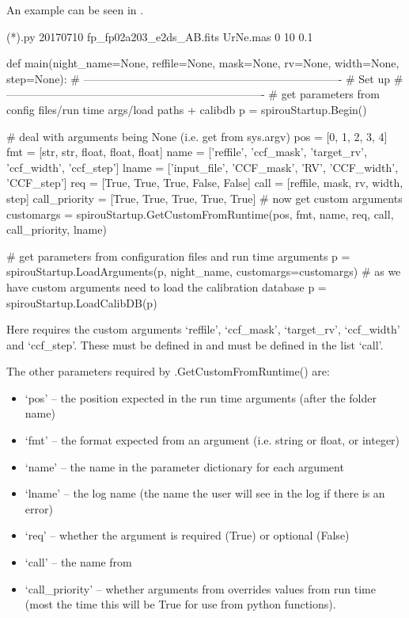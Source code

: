 \begin{minipage}{\textwidth}
An example can be seen in \calCCF.
\begin{cmdbox}
(*\calCCF*).py 20170710 fp_fp02a203_e2ds_AB.fits UrNe.mas 0 10 0.1
\end{cmdbox}
\begin{pythonbox}
def main(night_name=None, reffile=None, mask=None, rv=None, width=None,
         step=None):
    # ----------------------------------------------------------------------
    # Set up
    # ----------------------------------------------------------------------
    # get parameters from config files/run time args/load paths + calibdb
    p = spirouStartup.Begin()

    # deal with arguments being None (i.e. get from sys.argv)
    pos = [0, 1, 2, 3, 4]
    fmt = [str, str, float, float, float]
    name = ['reffile', 'ccf_mask', 'target_rv', 'ccf_width', 'ccf_step']
    lname = ['input_file', 'CCF_mask', 'RV', 'CCF_width', 'CCF_step']
    req = [True, True, True, False, False]
    call = [reffile, mask, rv, width, step]
    call_priority = [True, True, True, True, True]
    # now get custom arguments
    customargs = spirouStartup.GetCustomFromRuntime(pos, fmt, name, req, call,
                                                    call_priority, lname)
    
    # get parameters from configuration files and run time arguments
    p = spirouStartup.LoadArguments(p, night_name, customargs=customargs)
    # as we have custom arguments need to load the calibration database
    p = spirouStartup.LoadCalibDB(p)

\end{pythonbox}
\begin{note}
Here \calCCF requires the custom arguments `reffile', `ccf\_mask', `target\_rv', `ccf\_width' and `ccf\_step'. These must be defined in \progMAIN and must be defined in the list `call'. 

The other parameters required by \spirouStartup.GetCustomFromRuntime() are:
\begin{itemize}
	\item `pos' -- the position expected in the run time arguments (after the folder name)
	\item `fmt' -- the format expected from an argument (i.e. string or float, or integer)
	\item `name' -- the name in the parameter dictionary for each argument
	\item `lname' -- the log name (the name the user will see in the log if there is an error)
	\item `req' -- whether the argument is required (True) or optional (False)
	\item `call' -- the name from \progMAIN
	\item `call\_priority' -- whether arguments from \progMAIN overrides values from run time (most the time this will be True for use from python functions).
\end{itemize}
\end{note}
\end{minipage}

